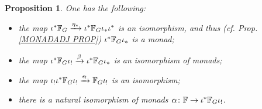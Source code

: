 \documentclass[a4paper,10pt
,draft
]{article}%
\numberwithin{equation}{section}
\numberwithin{figure}{section}
\newtheorem{proposition}[equation]{Proposition}%
\theoremstyle{definition} %
\newcommand{\1}{\ensuremath{\mathbbm 1}}%
\begin{document}
\begin{proposition}
        \label{MONAD_COMPARISON_PROP}
	One has the following:
\begin{itemize}
	\item[(i)]
	the map 
	$\iota^{\**} \mathbb{F}_G
		\xrightarrow{\eta_{\**}}
	\iota^{\**} \mathbb{F}_G \iota_{\**} \iota^{\**}$
	is an isomorphism, 
	and thus (cf. Prop. \ref{MONADADJ PROP})
	$\iota^{\**} \mathbb{F}_G \iota_{\**}$
	is a monad;
	\item[(ii)] the map 
	$\iota^{\**} \mathbb{F}_G \iota_{!}
	\xrightarrow{\beta}	
	\iota^{\**} \mathbb{F}_G \iota_{\**}$ is an isomorphism of monads;
	\item[(iii)] the map 
	$\iota_{!}\iota^{\**} \mathbb{F}_G \iota_{!}
	\xrightarrow{\epsilon_!}
	\mathbb{F}_G \iota_{!}$ is an isomorphism;
	\item[(iv)] there is a natural isomorphism of monads
	$\alpha \colon \mathbb{F} \to \iota^{\**} \mathbb{F}_G \iota_{!}$.
\end{itemize}
\end{proposition}
\end{document}
